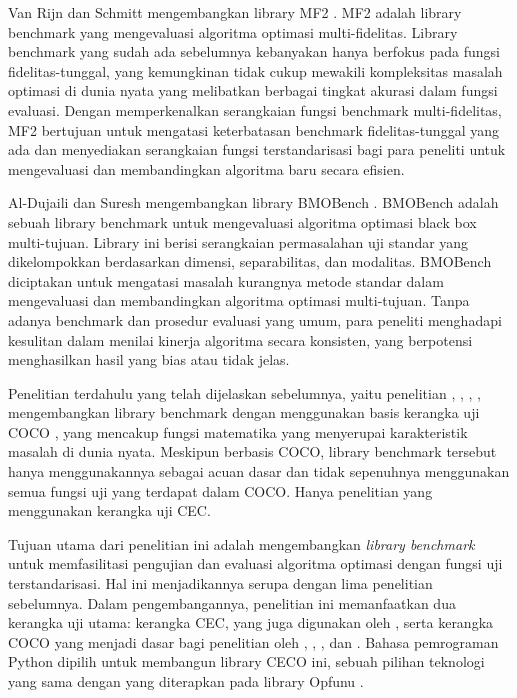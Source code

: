 Van Rijn dan Schmitt mengembangkan library MF2 \citep{van_Rijn_2020}. MF2 adalah library benchmark yang mengevaluasi algoritma optimasi multi-fidelitas. Library benchmark yang sudah ada sebelumnya kebanyakan hanya berfokus pada fungsi fidelitas-tunggal, yang kemungkinan tidak cukup mewakili kompleksitas masalah optimasi di dunia nyata yang melibatkan berbagai tingkat akurasi dalam fungsi evaluasi. Dengan memperkenalkan serangkaian fungsi benchmark multi-fidelitas, MF2 bertujuan untuk mengatasi keterbatasan benchmark fidelitas-tunggal yang ada dan menyediakan serangkaian fungsi terstandarisasi bagi para peneliti untuk mengevaluasi dan membandingkan algoritma baru secara efisien.

Al-Dujaili dan Suresh mengembangkan library BMOBench \citep{al-dujaili_2016}. BMOBench adalah sebuah library benchmark untuk mengevaluasi algoritma optimasi black box multi-tujuan. Library ini berisi serangkaian permasalahan uji standar yang dikelompokkan berdasarkan dimensi, separabilitas, dan modalitas. BMOBench diciptakan untuk mengatasi masalah kurangnya metode standar dalam mengevaluasi dan membandingkan algoritma optimasi multi-tujuan. Tanpa adanya benchmark dan prosedur evaluasi yang umum, para peneliti menghadapi kesulitan dalam menilai kinerja algoritma secara konsisten, yang berpotensi menghasilkan hasil yang bias atau tidak jelas.

Penelitian terdahulu yang telah dijelaskan sebelumnya, yaitu penelitian \citep{Bliek_2023}, \citep{ma_zeyan_guo_chen_jiacheng_zhenrui_peng_gong_ma_cao_2023}, \citep{van_Rijn_2020}, \citep{al-dujaili_2016}, mengembangkan library benchmark dengan menggunakan basis kerangka uji COCO \citep{hansen2021coco}, yang mencakup fungsi matematika yang menyerupai karakteristik masalah di dunia nyata. Meskipun berbasis COCO, library benchmark tersebut hanya menggunakannya sebagai acuan dasar \citep{ma_zeyan_guo_chen_jiacheng_zhenrui_peng_gong_ma_cao_2023} dan tidak sepenuhnya menggunakan semua fungsi uji yang terdapat dalam COCO. Hanya penelitian \citep{Van_Thieu_2024} yang menggunakan kerangka uji CEC.

Tujuan utama dari penelitian ini adalah mengembangkan \textit{library benchmark} untuk memfasilitasi pengujian dan evaluasi algoritma optimasi dengan fungsi uji terstandarisasi. Hal ini menjadikannya serupa dengan lima penelitian sebelumnya. Dalam pengembangannya, penelitian ini memanfaatkan dua kerangka uji utama: kerangka CEC, yang juga digunakan oleh \citep{Van_Thieu_2024}, serta kerangka COCO yang menjadi dasar bagi penelitian oleh \citep{Bliek_2023}, \citep{ma_zeyan_guo_chen_jiacheng_zhenrui_peng_gong_ma_cao_2023}, \citep{van_Rijn_2020}, dan \citep{al-dujaili_2016}. Bahasa pemrograman Python dipilih untuk membangun library CECO ini, sebuah pilihan teknologi yang sama dengan yang diterapkan pada library Opfunu \citep{Van_Thieu_2024}.

